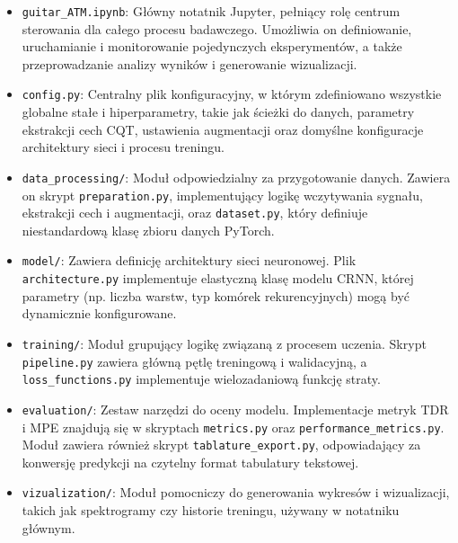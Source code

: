\begin{itemize}
    \item \texttt{guitar\_ATM.ipynb}: Główny notatnik Jupyter, pełniący rolę centrum sterowania dla całego procesu badawczego. Umożliwia on definiowanie, uruchamianie i monitorowanie pojedynczych eksperymentów, a także przeprowadzanie analizy wyników i generowanie wizualizacji.
    \item \texttt{config.py}: Centralny plik konfiguracyjny, w którym zdefiniowano wszystkie globalne stałe i hiperparametry, takie jak ścieżki do danych, parametry ekstrakcji cech CQT, ustawienia augmentacji oraz domyślne konfiguracje architektury sieci i procesu treningu.
    \item \texttt{data\_processing/}: Moduł odpowiedzialny za przygotowanie danych. Zawiera on skrypt \texttt{preparation.py}, implementujący logikę wczytywania sygnału, ekstrakcji cech i augmentacji, oraz \texttt{dataset.py}, który definiuje niestandardową klasę zbioru danych PyTorch.
    \item \texttt{model/}: Zawiera definicję architektury sieci neuronowej. Plik \texttt{architecture.py} implementuje elastyczną klasę modelu CRNN, której parametry (np. liczba warstw, typ komórek rekurencyjnych) mogą być dynamicznie konfigurowane.
    \item \texttt{training/}: Moduł grupujący logikę związaną z procesem uczenia. Skrypt \texttt{pipeline.py} zawiera główną pętlę treningową i walidacyjną, a \texttt{loss\_functions.py} implementuje wielozadaniową funkcję straty.
    \item \texttt{evaluation/}: Zestaw narzędzi do oceny modelu. Implementacje metryk TDR i MPE znajdują się w skryptach \texttt{metrics.py} oraz \texttt{performance\_metrics.py}. Moduł zawiera również skrypt \texttt{tablature\_export.py}, odpowiadający za konwersję predykcji na czytelny format tabulatury tekstowej.
    \item \texttt{vizualization/}: Moduł pomocniczy do generowania wykresów i wizualizacji, takich jak spektrogramy czy historie treningu, używany w notatniku głównym.
\end{itemize}